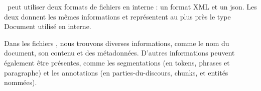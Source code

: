 \documentclass[manual-fr.tex]{subfiles}
\begin{document}
\SEM\ peut utiliser deux formats de fichiers en interne : un format XML et un json. Les deux donnent les mêmes informations et représentent au plus près le type Document utilisé en interne.

Dans les fichiers \SEM, nous trouvons diverses informations, comme le nom du document, son contenu et des métadonnées. D'autres informations peuvent également être présentes, comme les segmentations (en tokens, phrases et paragraphe) et les annotations (en parties-du-discours, chunks, et entités nommées).
\end{document}
